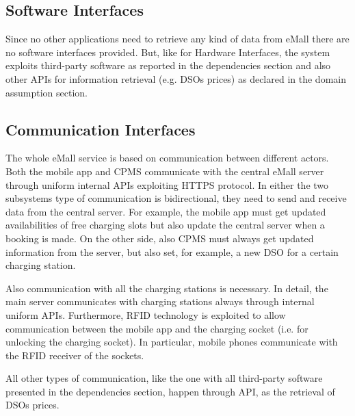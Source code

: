 \documentclass[a4paper]{report}
\begin{document}
\subsection{Software Interfaces}
Since no other applications need to retrieve any kind of data from eMall there are no software interfaces provided. But, like for Hardware Interfaces, the system exploits third-party software as reported in the dependencies section and also other APIs for information retrieval (e.g. DSOs prices) as declared in the domain assumption section.
\subsection{Communication Interfaces}
The whole eMall service is based on communication between different actors. Both the mobile app and CPMS communicate with the central eMall server through uniform internal APIs exploiting HTTPS protocol. In either the two subsystems type of communication is bidirectional, they need to send and receive data from the central server. For example, the mobile app must get updated availabilities of free charging slots but also update the central server when a booking is made. On the other side, also CPMS must always get updated information from the server, but also set, for example, a new DSO for a certain charging station. 

Also communication with all the charging stations is necessary. In detail, the main server communicates with charging stations always through internal uniform APIs. Furthermore, RFID technology is exploited to allow communication between the mobile app and the charging socket (i.e. for unlocking the charging socket). In particular, mobile phones communicate with the RFID receiver of the sockets.

All other types of communication, like the one with all third-party software presented in the dependencies section, happen through API, as the retrieval of DSOs prices.
\end{document}
